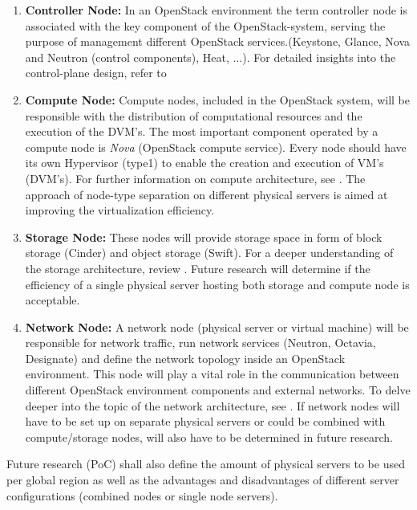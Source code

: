 \documentclass[]{article}
\begin{document}
\begin{enumerate}[label=\textbullet]
	\item\textbf{Controller Node:}
	In an OpenStack environment the term controller node is associated with the key component of the OpenStack-system, serving the purpose of management different OpenStack services.(Keystone, Glance, Nova and Neutron (control components), Heat, ...). 
	For detailed insights into the control-plane design, refer to \cite{OpenStackDoc-control}
			
	\item\textbf{Compute Node:}
	Compute nodes, included in the OpenStack system, will be responsible with the distribution of computational resources and the execution of the DVM's. 
	The most important component operated by a compute node is \textit{Nova} (OpenStack compute service).
	Every node should have its own Hypervisor (type1) to enable the creation and execution of VM's (DVM's). 
	For further information on compute architecture, see \cite{OpenStackDoc-compute}. 
	The approach of node-type separation on different physical servers is aimed at improving the virtualization efficiency.

	\item\textbf{Storage Node:}
	These nodes will provide storage space in form of block storage (Cinder) and object storage (Swift). 
	For a deeper understanding of the storage architecture, review \cite{OpenStackDoc-storage}.
 	Future research will determine if the efficiency of a single physical server hosting both storage and compute node is acceptable. 
  
	\item\textbf{Network Node:}
	A network node (physical server or virtual machine) will be responsible for network traffic, run network services (Neutron, Octavia, Designate) and define the network topology inside an OpenStack environment. 
	This node will play a vital role in the communication between different OpenStack environment components and external networks. 
	To delve deeper into the topic of the network architecture, see \cite{OpenStackDoc-network}. 
	If network nodes will have to be set up on separate physical servers or could be combined with compute/storage nodes, will also have to be determined in future research. 
\end{enumerate}

Future research (PoC) shall also define the amount of physical servers to be used per global region as well as the advantages and disadvantages of different server configurations (combined nodes or single node servers).
\newline
\end{document}
